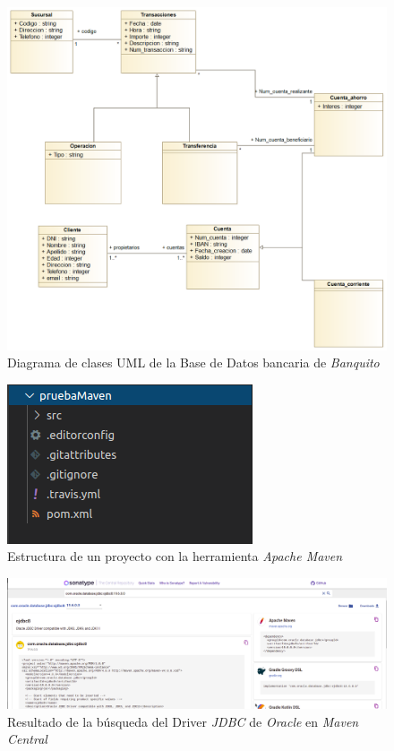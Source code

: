 \documentclass[11pt,a4paper]{article}
\begin{document}
\begin{figure}
\centering
\includegraphics[scale=0.45]{images/diagramauml.png}
\caption{Diagrama de clases UML de la Base de Datos bancaria de \emph{Banquito}}
\label{fig:diagramauml}
\end{figure}

\begin{figure}
\centering
\includegraphics[scale=1]{images/estructuraMAVEN.png}
\caption{Estructura de un proyecto con la herramienta \emph{Apache Maven}}
\label{fig:estructuraMAVEN}
\end{figure}

\begin{landscape}
\begin{figure}
\centering
\includegraphics[scale=0.4]{images/mavenCentral.png}
\caption{Resultado de la búsqueda del Driver \emph{JDBC} de \emph{Oracle} en \emph{Maven Central}}
\label{fig:mavenCentral}
\end{figure}
\end{landscape}
\end{document}
